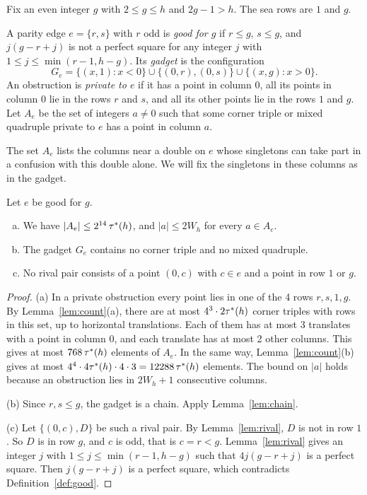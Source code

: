 Fix an even integer $g$ with $2\le g\le h$ and $2g-1>h$. The sea rows are $1$ and $g$.

\begin{definition}\label{def:good}
A parity edge $e=\{r,s\}$ with $r$ odd is \emph{good for $g$} if $r\le g$, $s\le g$, and
$j(g-r+j)$ is not a perfect square for any integer $j$ with $1\le j\le\min(r-1,h-g)$. Its
\emph{gadget} is the configuration
\[
 G_e=\{(x,1):x<0\}\cup\{(0,r),(0,s)\}\cup\{(x,g):x>0\}.
\]
An obstruction is \emph{private to $e$} if it has a point in column $0$, all its points
in column $0$ lie in the rows $r$ and $s$, and all its other points lie in the rows $1$ and
$g$. Let $A_e$ be the set of integers $a\ne0$ such that some corner triple or mixed
quadruple private to $e$ has a point in column $a$.
\end{definition}

The set $A_e$ lists the columns near a double on $e$ whose singletons can take part in a
confusion with this double alone. We will fix the singletons in these columns as in the
gadget.

\begin{lemma}\label{lem:onedouble}
Let $e$ be good for $g$.
\begin{enumerate}[(a)]
\item We have $|A_e|\le2^{14}\,{\tau^*}(h)$, and $|a|\le2W_h$ for every $a\in A_e$.
\item The gadget $G_e$ contains no corner triple and no mixed quadruple.
\item No rival pair consists of a point $(0,c)$ with $c\in e$ and a point in row $1$ or
$g$.
\end{enumerate}
\end{lemma}

\begin{proof}
(a) In a private obstruction every point lies in one of the 4 rows $r,s,1,g$. By
Lemma~\ref{lem:count}(a), there are at most $4^3\cdot2{\tau^*}(h)$ corner triples with rows
in this set, up to horizontal translations. Each of them has at most 3 translates with a
point in column $0$, and each translate has at most 2 other columns. This gives at most
$768\,{\tau^*}(h)$ elements of $A_e$. In the same way, Lemma~\ref{lem:count}(b) gives at most
$4^4\cdot4{\tau^*}(h)\cdot4\cdot3=12288\,{\tau^*}(h)$ elements. The bound on $|a|$ holds because
an obstruction lies in $2W_h+1$ consecutive columns.

(b) Since $r,s\le g$, the gadget is a chain. Apply Lemma~\ref{lem:chain}.

(c) Let $\{(0,c),D\}$ be such a rival pair. By Lemma~\ref{lem:rival}, $D$ is not in row
$1$. So $D$ is in row $g$, and $c$ is odd, that is $c=r<g$. Lemma~\ref{lem:rival} gives
an integer $j$ with $1\le j\le\min(r-1,h-g)$ such that $4j(g-r+j)$ is a perfect square.
Then $j(g-r+j)$ is a perfect square, which contradicts Definition~\ref{def:good}.
\end{proof}


